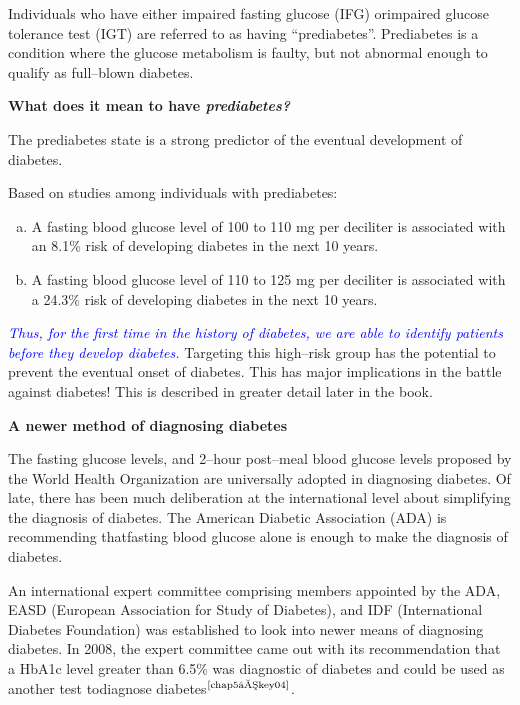 Individuals who have either impaired fasting glucose (IFG) or\break impaired glucose tolerance test (IGT) are referred to as having “prediabetes”. Prediabetes is a condition where the glucose metabolism is faulty, but not abnormal enough to qualify as full–blown diabetes.

\noindent
\textbf{What does it mean to have \textit{prediabetes?}}

The prediabetes state is a strong predictor of the eventual deve\-lopment of diabetes.

Based on studies among individuals with prediabetes:

\begin{enumerate}[a)]
\itemsep=0pt
\item A fasting blood glucose level of 100 to 110 mg per deciliter is asso\-ciated with an 8.1\% risk of developing diabetes in the next 10 years.
 \item A fasting blood glucose level of 110 to 125 mg per deciliter is associated with a 24.3\% risk of developing diabetes in the next 10 years.
 \end{enumerate}

\textcolor{blue}{\textit{Thus, for the first time in the history of diabetes, we are able to identify patients before they develop diabetes.}} Targeting this high–risk group has the potential to prevent the eventual onset of diabetes. This has major implications in the battle against diabetes! This is described in greater detail later in the book.

\noindent
\textbf{A newer method of diagnosing diabetes}

The fasting glucose levels, and 2–hour post–meal blood glu\-cose le\-vels proposed by the World Health Organization are universally ado\-pted in diagnosing diabetes. Of late, there has been much deliberation at the international level about simplifying the diagnosis of diabetes. The American Diabetic Association (ADA) is recommending that\break fasting blood glucose alone is enough to make the diagnosis of diabetes.


An international expert committee comprising members appoin\-ted by the ADA, EASD (European Association for Study of Diabetes), and IDF (International Diabetes Foundation) was established to look into newer means of diagnosing diabetes. In 2008, the expert commi\-ttee came out with its recommendation that a HbA1c level greater than 6.5\% was diagnostic of diabetes and could be used as another test to\break diagnose diabetes$^{\text{\cite{chap5–key04}}}$.

